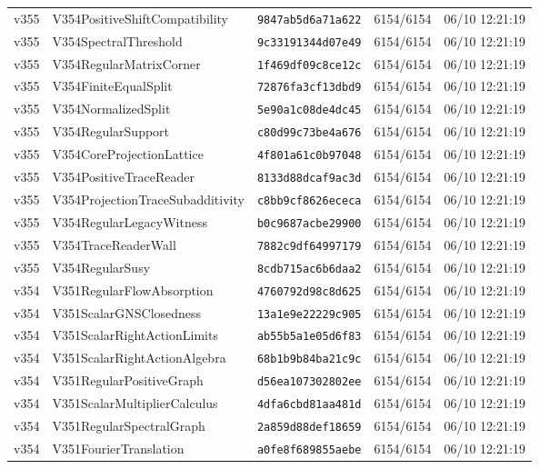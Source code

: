 \documentclass[11pt]{article}
\theoremstyle{definition}\newtheorem{deriv}{Derivation}
\begin{document}
{\begin{longtable}{@{}lllll@{}}
v355 & V354PositiveShiftCompatibility & \texttt{9847ab5d6a71a622} & 6154/6154 & 06/10 12:21:19 \\
v355 & V354SpectralThreshold & \texttt{9c33191344d07e49} & 6154/6154 & 06/10 12:21:19 \\
v355 & V354RegularMatrixCorner & \texttt{1f469df09c8ce12c} & 6154/6154 & 06/10 12:21:19 \\
v355 & V354FiniteEqualSplit & \texttt{72876fa3cf13dbd9} & 6154/6154 & 06/10 12:21:19 \\
v355 & V354NormalizedSplit & \texttt{5e90a1c08de4dc45} & 6154/6154 & 06/10 12:21:19 \\
v355 & V354RegularSupport & \texttt{c80d99c73be4a676} & 6154/6154 & 06/10 12:21:19 \\
v355 & V354CoreProjectionLattice & \texttt{4f801a61c0b97048} & 6154/6154 & 06/10 12:21:19 \\
v355 & V354PositiveTraceReader & \texttt{8133d88dcaf9ac3d} & 6154/6154 & 06/10 12:21:19 \\
v355 & V354ProjectionTraceSubadditivity & \texttt{c8bb9cf8626ececa} & 6154/6154 & 06/10 12:21:19 \\
v355 & V354RegularLegacyWitness & \texttt{b0c9687acbe29900} & 6154/6154 & 06/10 12:21:19 \\
v355 & V354TraceReaderWall & \texttt{7882c9df64997179} & 6154/6154 & 06/10 12:21:19 \\
v355 & V354RegularSusy & \texttt{8cdb715ac6b6daa2} & 6154/6154 & 06/10 12:21:19 \\
v354 & V351RegularFlowAbsorption & \texttt{4760792d98c8d625} & 6154/6154 & 06/10 12:21:19 \\
v354 & V351ScalarGNSClosedness & \texttt{13a1e9e22229c905} & 6154/6154 & 06/10 12:21:19 \\
v354 & V351ScalarRightActionLimits & \texttt{ab55b5a1e05d6f83} & 6154/6154 & 06/10 12:21:19 \\
v354 & V351ScalarRightActionAlgebra & \texttt{68b1b9b84ba21c9c} & 6154/6154 & 06/10 12:21:19 \\
v354 & V351RegularPositiveGraph & \texttt{d56ea107302802ee} & 6154/6154 & 06/10 12:21:19 \\
v354 & V351ScalarMultiplierCalculus & \texttt{4dfa6cbd81aa481d} & 6154/6154 & 06/10 12:21:19 \\
v354 & V351RegularSpectralGraph & \texttt{2a859d88def18659} & 6154/6154 & 06/10 12:21:19 \\
v354 & V351FourierTranslation & \texttt{a0fe8f689855aebe} & 6154/6154 & 06/10 12:21:19 \\

\end{longtable}}
\end{document}
